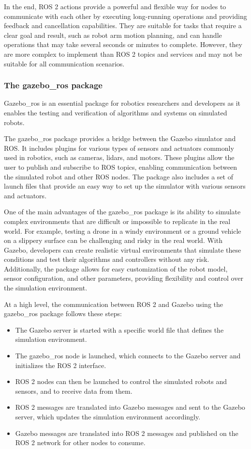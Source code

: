 \documentclass[12pt,oneside]{article}
\begin{document}
In the end, ROS 2 actions provide a powerful and flexible way for nodes to communicate with each other by executing long-running operations and providing feedback and cancellation capabilities. They are suitable for tasks that require a clear goal and result, such as robot arm motion planning, and can handle operations that may take several seconds or minutes to complete. However, they are more complex to implement than ROS 2 topics and services and may not be suitable for all communication scenarios.

\subsubsection{The gazebo\_ros package}
Gazebo\_ros is an essential package for robotics researchers and developers as it enables the testing and verification of algorithms and systems on simulated robots.

The gazebo\_ros package provides a bridge between the Gazebo simulator and ROS. It includes plugins for various types of sensors and actuators commonly used in robotics, such as cameras, lidars, and motors. These plugins allow the user to publish and subscribe to ROS topics, enabling communication between the simulated robot and other ROS nodes. The package also includes a set of launch files that provide an easy way to set up the simulator with various sensors and actuators.

One of the main advantages of the gazebo\_ros package is its ability to simulate complex environments that are difficult or impossible to replicate in the real world. For example, testing a drone in a windy environment or a ground vehicle on a slippery surface can be challenging and risky in the real world. With Gazebo, developers can create realistic virtual environments that simulate these conditions and test their algorithms and controllers without any risk. Additionally, the package allows for easy customization of the robot model, sensor configuration, and other parameters, providing flexibility and control over the simulation environment.

At a high level, the communication between ROS 2 and Gazebo using the gazebo\_ros package follows these steps:
\begin{itemize}
\item The Gazebo server is started with a specific world file that defines the simulation environment.
\item The gazebo\_ros node is launched, which connects to the Gazebo server and initializes the ROS 2 interface.
\item ROS 2 nodes can then be launched to control the simulated robots and sensors, and to receive data from them.
\item ROS 2 messages are translated into Gazebo messages and sent to the Gazebo server, which updates the simulation environment accordingly.
\item Gazebo messages are translated into ROS 2 messages and published on the ROS 2 network for other nodes to consume.
\end{itemize}
\end{document}
